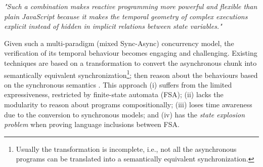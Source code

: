 \documentclass[acmsmall,review,anonymous]{acmart}\settopmatter{printfolios=true,printccs=false,printacmref=false}
\begin{document}
%




\textit{"Such a combination makes reactive programming more powerful and flexible than plain JavaScript because it makes the temporal geometry of complex executions explicit instead of hidden in implicit relations between state variables." \cite{berry2020hiphop}}

Given such a multi-paradigm (mixed Sync-Async) concurrency model, the verification of its temporal behaviour becomes engaging and challenging. 
Existing techniques are based on a transformation to convert the asynchronous chunk into semantically equivalent synchronization\footnote{Usually the transformation is incomplete, i.e., not all the asynchronous programs can be translated into a semantically equivalent synchronization.}; then reason about the behaviours based on the synchronous semantics \cite{damian2019communication,gleissenthall2019pretend,tarawneh2018formal}. This approach (i) suffers from the limited expressiveness, restricted by finite-state automata (FSA); (ii) lacks the modularity to reason about programs compositionally; (iii) loses time awareness due to the conversion to synchronous models; and (iv) has the \emph{state explosion problem}  when proving language inclusions between FSA.
\end{document}
